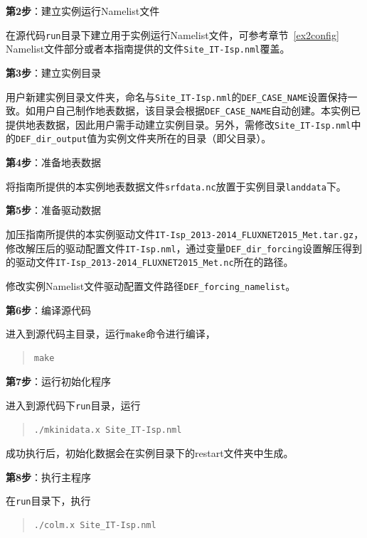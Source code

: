 \bigskip
\textbf{第2步}：建立实例运行Namelist文件

在源代码\texttt{run}目录下建立用于实例运行Namelist文件，可参考章节~\ref{ex2config} Namelist文件部分或者本指南提供的文件\texttt{Site\_IT-Isp.nml}覆盖。

\bigskip
\textbf{第3步}：建立实例目录

用户新建实例目录文件夹，命名与\texttt{Site\_IT-Isp.nml}的\texttt{DEF\_CASE\_NAME}设置保持一致。如用户自己制作地表数据，该目录会根据\texttt{DEF\_CASE\_NAME}自动创建。本实例已提供地表数据，因此用户需手动建立实例目录。另外，需修改\texttt{Site\_IT-Isp.nml}中的\texttt{DEF\_dir\_output}值为实例文件夹所在的目录（即父目录）。

\bigskip
\textbf{第4步}：准备地表数据

将指南所提供的本实例地表数据文件\texttt{srfdata.nc}放置于实例目录\texttt{landdata}下。

\bigskip
\textbf{第5步}：准备驱动数据

加压指南所提供的本实例驱动文件\texttt{IT-Isp\_2013-2014\_FLUXNET2015\_Met.tar.gz}，修改解压后的驱动配置文件\texttt{IT-Isp.nml}，通过变量\texttt{DEF\_dir\_forcing}设置解压得到的驱动文件\texttt{IT-Isp\_2013-2014\_FLUXNET2015\_Met.nc}所在的路径。

修改实例Namelist文件驱动配置文件路径\texttt{DEF\_forcing\_namelist}。

\bigskip
\textbf{第6步}：编译源代码

进入到源代码主目录，运行\texttt{make}命令进行编译，
\begin{quote}
\begin{lstlisting}
make
\end{lstlisting}
\end{quote}

\bigskip
\textbf{第7步}：运行初始化程序

进入到源代码下\texttt{run}目录，运行
\begin{quote}
\begin{lstlisting}
./mkinidata.x Site_IT-Isp.nml
\end{lstlisting}
\end{quote}

成功执行后，初始化数据会在实例目录下的restart文件夹中生成。

\bigskip
\textbf{第8步}：执行主程序

在\texttt{run}目录下，执行
\begin{quote}
\begin{lstlisting}
./colm.x Site_IT-Isp.nml
\end{lstlisting}
\end{quote}

